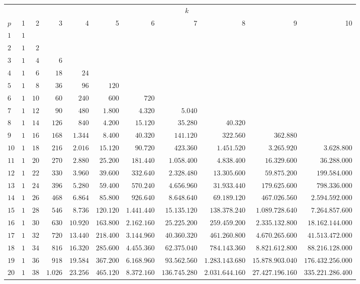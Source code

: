 \documentclass[
  letterpaper,
  DIV=11,
  numbers=noendperiod]{scrreprt}
\begin{document}
\begin{longtable*}{l|rrrrrrrrrr}
\toprule
{} &  \\ 
\cmidrule(lr){2-11}
 & 1 & 2 & 3 & 4 & 5 & 6 & 7 & 8 & 9 & 10 \\ 
\midrule\addlinespace[2.5pt]
$1$ & $1$ &  &  &  &  &  &  &  &  &  \\ 
$2$ & $1$ & $2$ &  &  &  &  &  &  &  &  \\ 
$3$ & $1$ & $4$ & $6$ &  &  &  &  &  &  &  \\ 
$4$ & $1$ & $6$ & $18$ & $24$ &  &  &  &  &  &  \\ 
$5$ & $1$ & $8$ & $36$ & $96$ & $120$ &  &  &  &  &  \\ 
$6$ & $1$ & $10$ & $60$ & $240$ & $600$ & $720$ &  &  &  &  \\ 
$7$ & $1$ & $12$ & $90$ & $480$ & $1.800$ & $4.320$ & $5.040$ &  &  &  \\ 
$8$ & $1$ & $14$ & $126$ & $840$ & $4.200$ & $15.120$ & $35.280$ & $40.320$ &  &  \\ 
$9$ & $1$ & $16$ & $168$ & $1.344$ & $8.400$ & $40.320$ & $141.120$ & $322.560$ & $362.880$ &  \\ 
$10$ & $1$ & $18$ & $216$ & $2.016$ & $15.120$ & $90.720$ & $423.360$ & $1.451.520$ & $3.265.920$ & $3.628.800$ \\ 
$11$ & $1$ & $20$ & $270$ & $2.880$ & $25.200$ & $181.440$ & $1.058.400$ & $4.838.400$ & $16.329.600$ & $36.288.000$ \\ 
$12$ & $1$ & $22$ & $330$ & $3.960$ & $39.600$ & $332.640$ & $2.328.480$ & $13.305.600$ & $59.875.200$ & $199.584.000$ \\ 
$13$ & $1$ & $24$ & $396$ & $5.280$ & $59.400$ & $570.240$ & $4.656.960$ & $31.933.440$ & $179.625.600$ & $798.336.000$ \\ 
$14$ & $1$ & $26$ & $468$ & $6.864$ & $85.800$ & $926.640$ & $8.648.640$ & $69.189.120$ & $467.026.560$ & $2.594.592.000$ \\ 
$15$ & $1$ & $28$ & $546$ & $8.736$ & $120.120$ & $1.441.440$ & $15.135.120$ & $138.378.240$ & $1.089.728.640$ & $7.264.857.600$ \\ 
$16$ & $1$ & $30$ & $630$ & $10.920$ & $163.800$ & $2.162.160$ & $25.225.200$ & $259.459.200$ & $2.335.132.800$ & $18.162.144.000$ \\ 
$17$ & $1$ & $32$ & $720$ & $13.440$ & $218.400$ & $3.144.960$ & $40.360.320$ & $461.260.800$ & $4.670.265.600$ & $41.513.472.000$ \\ 
$18$ & $1$ & $34$ & $816$ & $16.320$ & $285.600$ & $4.455.360$ & $62.375.040$ & $784.143.360$ & $8.821.612.800$ & $88.216.128.000$ \\ 
$19$ & $1$ & $36$ & $918$ & $19.584$ & $367.200$ & $6.168.960$ & $93.562.560$ & $1.283.143.680$ & $15.878.903.040$ & $176.432.256.000$ \\ 
$20$ & $1$ & $38$ & $1.026$ & $23.256$ & $465.120$ & $8.372.160$ & $136.745.280$ & $2.031.644.160$ & $27.427.196.160$ & $335.221.286.400$ \\ 
\bottomrule
\end{longtable*}
\end{document}

